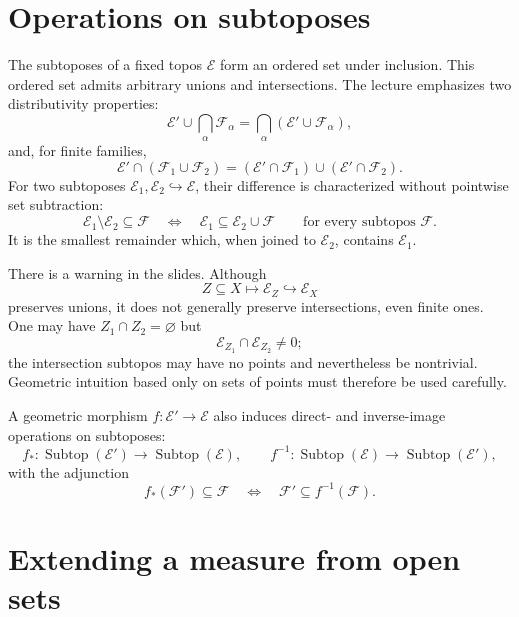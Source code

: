 \section{Operations on subtoposes}

The subtoposes of a fixed topos \(\mathcal E\) form an ordered set under inclusion. This ordered set admits arbitrary unions and intersections. The lecture emphasizes two distributivity properties:
\[
 \mathcal E'\cup\bigcap_{\alpha}\mathcal F_\alpha
 =\bigcap_\alpha(\mathcal E'\cup\mathcal F_\alpha),
\]
and, for finite families,
\[
 \mathcal E'\cap(\mathcal F_1\cup\mathcal F_2)
 =(\mathcal E'\cap\mathcal F_1)\cup
  (\mathcal E'\cap\mathcal F_2).
\]
For two subtoposes \(\mathcal E_1,\mathcal E_2\hookrightarrow\mathcal E\), their difference is characterized without pointwise set subtraction:
\begin{equation}
 \mathcal E_1\setminus\mathcal E_2\subseteq\mathcal F
 \quad\Longleftrightarrow\quad
 \mathcal E_1\subseteq\mathcal E_2\cup\mathcal F
 \qquad\text{for every subtopos }\mathcal F.
 \label{eq:N20261026-subtopos-difference}
\end{equation}
It is the smallest remainder which, when joined to \(\mathcal E_2\), contains \(\mathcal E_1\).

There is a warning in the slides. Although
\[
 Z\subseteq X\longmapsto\mathcal E_Z\hookrightarrow\mathcal E_X
\]
preserves unions, it does not generally preserve intersections, even finite ones. One may have \(Z_1\cap Z_2=\varnothing\) but
\[
 \mathcal E_{Z_1}\cap\mathcal E_{Z_2}\ne0;
\]
the intersection subtopos may have no points and nevertheless be nontrivial. Geometric intuition based only on sets of points must therefore be used carefully.

A geometric morphism \(f:\mathcal E'\to\mathcal E\) also induces direct- and inverse-image operations on subtoposes:
\[
 f_*:\operatorname{Subtop}(\mathcal E')\to\operatorname{Subtop}(\mathcal E),
 \qquad
 f^{-1}:\operatorname{Subtop}(\mathcal E)\to\operatorname{Subtop}(\mathcal E'),
\]
with the adjunction
\[
 f_*(\mathcal F')\subseteq\mathcal F
 \quad\Longleftrightarrow\quad
 \mathcal F'\subseteq f^{-1}(\mathcal F).
\]

\section{Extending a measure from open sets}


